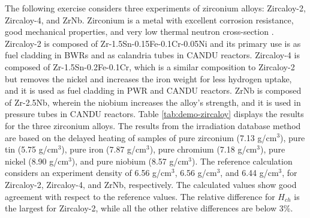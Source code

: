 The following exercise considers three experiments of zirconium alloys: Zircaloy-2, Zircaloy-4, and ZrNb.
Zirconium is a metal with excellent corrosion resistance, good mechanical properties, and very low thermal neutron cross-section \cite{zircaloy}.
Zircaloy-2 is composed of Zr-1.5Sn-0.15Fe-0.1Cr-0.05Ni and its primary use is as fuel cladding in \glspl*{BWR} and as calandria tubes in CANDU reactors.
Zircaloy-4 is composed of Zr-1.5Sn-0.2Fe-0.1Cr, which is a similar composition to Zircaloy-2 but removes the nickel and increases the iron weight for less hydrogen uptake, and it is used as fuel cladding in \gls*{PWR} and CANDU reactors.
ZrNb is composed of Zr-2.5Nb, wherein the niobium increases the alloy's strength, and it is used in pressure tubes in CANDU reactors.
%
Table \ref{tab:demo-zircaloy} displays the results for the three zirconium alloys.
The results from the irradiation database method are based on the delayed heating of samples of pure zirconium (7.13 g/cm$^3$), pure tin (5.75 g/cm$^3$), pure iron (7.87 g/cm$^3$), pure chromium (7.18 g/cm$^3$), pure nickel (8.90 g/cm$^3$), and pure niobium (8.57 g/cm$^3$).
The reference calculation considers an experiment density of 6.56 g/cm$^3$, 6.56 g/cm$^3$, and 6.44 g/cm$^3$, for Zircaloy-2, Zircaloy-4, and ZrNb, respectively.
The calculated values show good agreement with respect to the reference values.
The relative difference for $H_{ch}$ is the largest for Zircaloy-2, while all the other relative differences are below 3\%.

